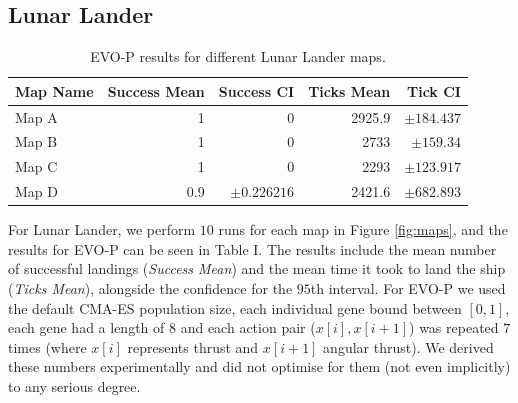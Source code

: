 \documentclass[conference]{IEEEtran}
\begin{document}
\subsection{Lunar Lander}

\begin{table}[h]
	\begin{tabular}{lrrrr}
\hline
 Map Name   &   Success Mean &   Success CI &   Ticks Mean &   Tick CI \\
\hline
 Map A       &            1   &     0        &       2925.9 &   $\pm 184.437$ \\
 Map B  &            1   &     0        &       2733   &   $\pm 159.34$  \\
 Map C  &            1   &     0        &       2293   &   $\pm 123.917$ \\
 Map D  &            0.9 &     $\pm 0.226216$ &       2421.6 &   $\pm 682.893$ \\
\hline
\end{tabular}
\label{tb:results}
\caption{EVO-P results for different Lunar Lander maps.}
\end{table}


For Lunar Lander, we perform $10$ runs for each map in Figure \ref{fig:maps}, and the results for EVO-P can be seen in Table I. The results include the mean number of successful landings (\emph{Success Mean}) and the mean time it took to land the ship (\emph{Ticks Mean}), alongside the confidence for the $95$th interval.   For EVO-P we used the default CMA-ES population size, each individual gene bound between $[0,1]$, each gene had a length of $8$ and each action pair ($x[i], x[i+1]$) was repeated $7$ times (where $x[i]$ represents thrust and $x[i+1]$ angular thrust). We derived these numbers experimentally and did not optimise for them (not even implicitly) to any serious degree.  
\end{document}
